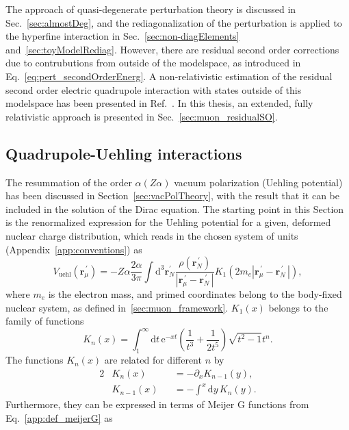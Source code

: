 The approach of quasi-degenerate perturbation theory is discussed in Sec.~\ref{sec:almostDeg}, and the rediagonalization of the perturbation is applied to the hyperfine interaction in Sec.~\ref{sec:non-diagElements} and~\ref{sec:toyModelRediag}. However, there are residual second order corrections due to contrubutions from outside of the modelspace, as introduced in Eq.~\eqref{eq:pert_secondOrderEnerg}. A non-relativistic estimation of the residual second order electric quadrupole interaction with states outside of this modelspace has been presented in Ref.~\cite{chen1970}. In this thesis, an extended, fully relativistic approach is presented in Sec.~\ref{sec:muon_residualSO}.

\subsection{Quadrupole-Uehling interactions}
\label{sec:muon_quadUehl}
The resummation of the order $\alpha (Z\alpha)$ vacuum polarization (Uehling potential) has been discussed in Section~\ref{sec:vacPolTheory}, with the result that it can be included in the solution of the Dirac equation. The starting point in this Section is the renormalized expression for the Uehling potential for a given, deformed nuclear charge distribution, which reads in the chosen system of units (Appendix~\ref{app:conventions}) as~\cite{Fullerton1976}
\begin{equation}
{V_{\text{uehl}}(\mathbf{r}_\mu^{\,\prime})}{=}{-Z\alpha\frac{2 \alpha}{3\pi} \int \text{d}^3\mathbf{r}_N^{\prime} \frac{\rho(\mathbf{r}_N^{\,\prime})}{|\mathbf{r}_\mu^{\,\prime} - \mathbf{r}_N^{\,\prime}\,|} K_1(2m_e{|\mathbf{r}_\mu^{\,\prime} - \mathbf{r}_N^{\,\prime}\,|}),}
\label{eq:Vvp}
\end{equation}
where $m_e$ is the electron mass, and primed coordinates belong to the body-fixed nuclear system, as defined in~\ref{sec:muon_framework}. $K_1(x)$ belongs to the family of functions
\begin{equation}
K_n(x)=\int_1^\infty \text{d}t\,\text{e}^{-xt}\left(\frac{1}{t^3}+\frac{1}{2t^5}\right)\sqrt{t^2-1}t^n.
\label{eq:defKn}
\end{equation}
The functions $K_n(x)$ are related for different $n$ by
\begin{alignat}{2}
&K_n(x)&&=-\partial_x K_{n-1}(y),\\
&K_{n-1}(x)&&=-\int^x\text{d}y\, K_n(y).
\label{eq:Kninfo}
\end{alignat}
Furthermore, they can be expressed in terms of Meijer G functions from Eq.~\eqref{app:def_meijerG} as
